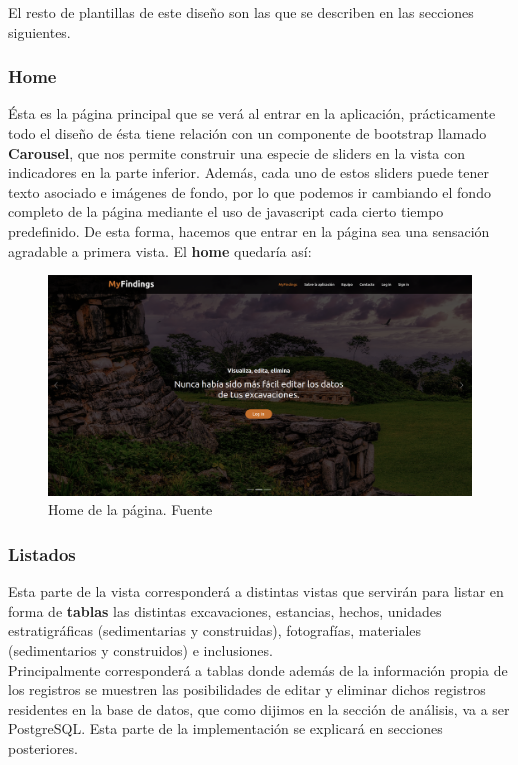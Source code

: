 El resto de plantillas de este diseño son las que se describen en las secciones siguientes.

    \subsubsection{Home}
    Ésta es la página principal que se verá al entrar en la aplicación, prácticamente todo el
    diseño de ésta tiene relación con un componente de bootstrap llamado \textbf{Carousel}, que
    nos permite construir una especie de sliders en la vista con indicadores en la parte
    inferior. Además, cada uno de estos sliders puede tener texto asociado e imágenes de fondo,
    por lo que podemos ir cambiando el fondo completo de la página mediante el uso de javascript
    cada cierto tiempo predefinido. De esta forma, hacemos que entrar en la página sea una
    sensación agradable a primera vista. El \textbf{home} quedaría así:
    
        \begin{figure}[H]
            \centering
            \includegraphics[scale=0.19]{imagenes/home.png}
            \caption[Home de la página]{Home de la página. Fuente \cite{maya}}
            \label{fig:home}
        \end{figure}

    \subsubsection{Listados}
    Esta parte de la vista corresponderá a distintas vistas que servirán para listar en forma
    de \textbf{tablas} las distintas excavaciones, estancias, hechos, unidades estratigráficas
    (sedimentarias y construidas), fotografías, materiales (sedimentarios y construidos) e
    inclusiones.\\

    Principalmente corresponderá a tablas donde además de la información propia
    de los registros se muestren las posibilidades de editar y eliminar dichos registros
    residentes en la base de datos, que como dijimos en la sección de análisis, va a ser
    PostgreSQL. Esta parte de la implementación se explicará en secciones posteriores.

